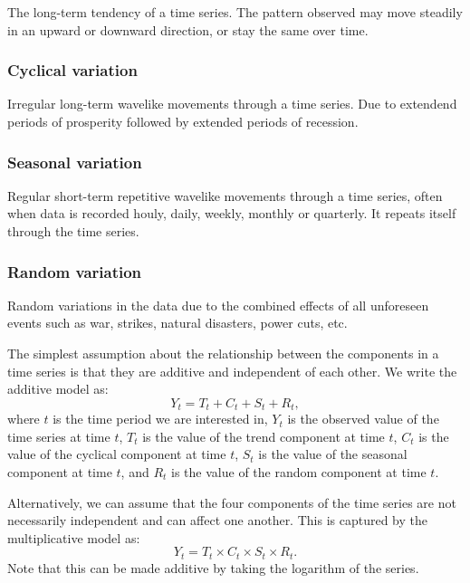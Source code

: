          The long-term tendency of a time series. The pattern observed may move steadily in an upward or downward direction, or stay the same over time.

      \subsubsection{Cyclical variation}

         Irregular long-term wavelike movements through a time series. Due to extendend periods of prosperity followed by extended periods of recession.

      \subsubsection{Seasonal variation}

         Regular short-term repetitive wavelike movements through a time series, often when data is recorded houly, daily, weekly, monthly or quarterly. It repeats itself through the time series.

      \subsubsection{Random variation}

         Random variations in the data due to the combined effects of all unforeseen events such as war, strikes, natural disasters, power cuts, etc. 

      \vspace{1em}

      The simplest assumption about the relationship between the components in a time series is that they are additive and independent of each other. We write the additive model as: \[Y_{t} = T_{t} + C_{t} + S_{t} + R_{t},\] where \(t\) is the time period we are interested in, \(Y_{t}\) is the observed value of the time series at time \(t\), \(T_{t}\) is the value of the trend component at time \(t\), \(C_{t}\) is the value of the cyclical component at time \(t\), \(S_{t}\) is the value of the seasonal component at time \(t\), and \(R_{t}\) is the value of the random component at time \(t\).

      \vspace{1em}

      Alternatively, we can assume that the four components of the time series are not necessarily independent and can affect one another. This is captured by the multiplicative model as: \[Y_{t} = T_{t} \times C_{t} \times S_{t} \times R_{t}.\] Note that this can be made additive by taking the logarithm of the series.

